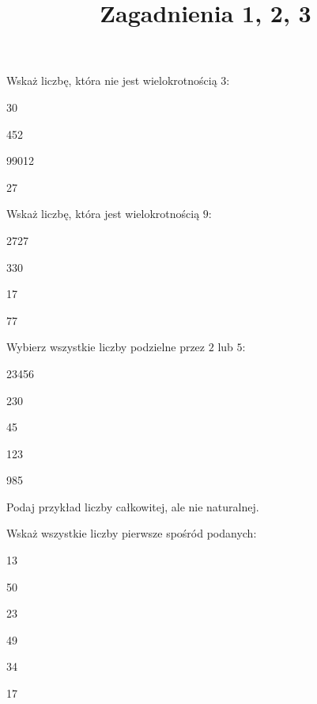 \documentclass{article}
\title{Zagadnienia 1, 2, 3}
\author{}
\date{}
\begin{document}
\maketitle

\begin{zadanko}
  Wskaż liczbę, która nie jest wielokrotnością $3$:
  
  \begin{podpunkty}[4]
    \item 30
    \item 452
    \item 99012
    \item 27
  \end{podpunkty}
\end{zadanko}

\begin{zadanko}
  Wskaż liczbę, która jest wielokrotnością $9$:
  
  \begin{podpunkty}[2]
    \item 2727
    \item 330
    \item 17
    \item 77
  \end{podpunkty}
\end{zadanko}

\begin{zadanko}[50]
  Wybierz wszystkie liczby podzielne przez $2$ lub $5$:

  \begin{podpunkty}[3]
    \item 23456
    \item 230
    \item 45
    \item 123
    \item 985
  \end{podpunkty}
\end{zadanko}

\begin{zadanko}
  Podaj przykład liczby całkowitej, ale nie naturalnej.
\end{zadanko}

\begin{zadanko}
  Wskaż wszystkie liczby pierwsze spośród podanych:
  
  \begin{podpunkty}[3]
  \item 13
  \item 50
  \item 23
  \item 49
  \item 34
  \item 17
  \end{podpunkty}
\end{zadanko}
\end{document}
